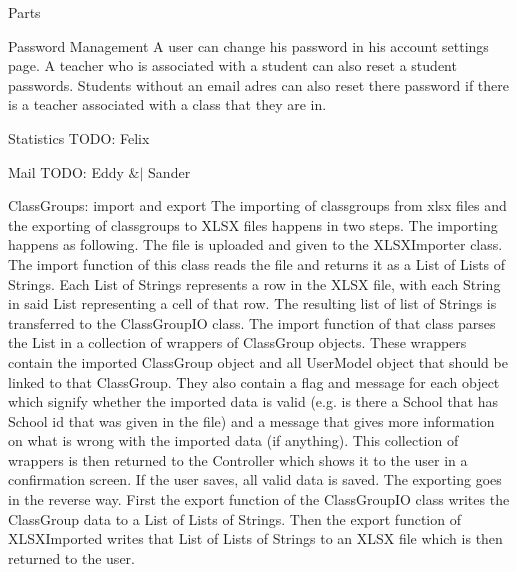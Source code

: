 \documentclass[]{article}
\begin{document}
\begin{section}{Parts}
\begin{subsection}{Password Management}
		A user can change his password in his account settings page. A teacher who is associated with a student 		can also reset a student passwords. Students without an email adres can also reset there password if there 			is a teacher associated with a class that they are in.
    \end{subsection} 
    \begin{subsection}{Statistics}
        TODO: Felix
    \end{subsection}
    \begin{subsection}{Mail}
        TODO: Eddy $\&|$ Sander
    \end{subsection}
    \begin{subsection}{ClassGroups: import and export}
    	The importing of classgroups from xlsx files and the exporting of classgroups to XLSX files happens in two 				steps. 
    	The importing happens as following. The file is uploaded and given to the XLSXImporter class. The 						import function of this class reads the file and returns it as a List of Lists of Strings. Each List of 					Strings represents a row in the XLSX file, with each String in said List representing a cell of that row. The 		resulting list of list of Strings is transferred to the ClassGroupIO class. The import function of that class 		parses the List in a collection of wrappers of ClassGroup objects. These wrappers contain the imported 					ClassGroup object and all UserModel object that should be linked to that ClassGroup. They also contain a 				flag and message for each object which signify whether the imported data is valid (e.g. is there a School 				that has School id that was given in the file) and a message that gives more information on what is wrong 				with the imported data (if anything). This collection of wrappers is then returned to the Controller which 				shows it to the user in a confirmation screen. If the user saves, all valid data is saved.
    	The exporting goes in the reverse way. First the export function of the ClassGroupIO class writes the 					ClassGroup data to a List of Lists of Strings. Then the export function of XLSXImported writes that List of 				Lists of Strings to an XLSX file which is then returned to the user.
        

\end{subsection}
\end{section}
\end{document}
